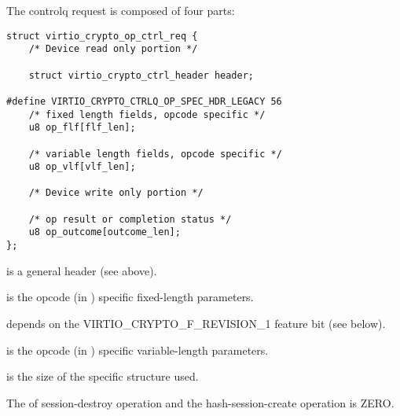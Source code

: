 The controlq request is composed of four parts:
\begin{lstlisting}
struct virtio_crypto_op_ctrl_req {
    /* Device read only portion */

    struct virtio_crypto_ctrl_header header;

#define VIRTIO_CRYPTO_CTRLQ_OP_SPEC_HDR_LEGACY 56
    /* fixed length fields, opcode specific */
    u8 op_flf[flf_len];

    /* variable length fields, opcode specific */
    u8 op_vlf[vlf_len];

    /* Device write only portion */

    /* op result or completion status */
    u8 op_outcome[outcome_len];
};
\end{lstlisting}

 is a general header (see above).

 is the opcode (in ) specific fixed-length parameters.

 depends on the VIRTIO_CRYPTO_F_REVISION_1 feature bit (see below).

 is the opcode (in ) specific variable-length parameters.

 is the size of the specific structure used.
\begin{note}
The  of session-destroy operation and the hash-session-create
operation is ZERO.
\end{note}

